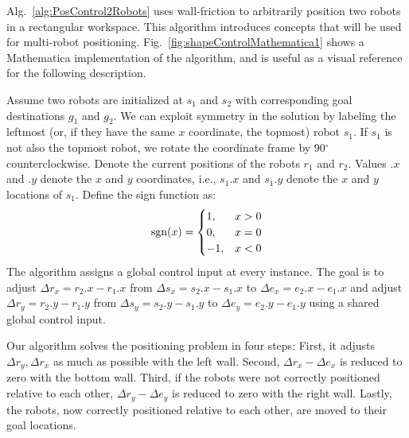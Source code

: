 \begin{figure*}
\caption{\label{fig:shapeControlMathematica1}{Frames from an implementation of Alg.\ \ref{alg:PosControl2Robots}: two robot positioning using walls with infinite friction. 
Robot start positions are shown by a square, and goal positions by a circle.  Dashed lines show the shortest route if robots could be controlled independently.  Solid arrows show path given by  Alg.\ \ref{alg:PosControl2Robots}.
Online demonstration and source code at \citep{Shahrokhi2015mathematicaParticle}.
}
\vspace{-1em}
}
\end{figure*}

Alg.~\ref{alg:PosControl2Robots} uses wall-friction to arbitrarily position two robots in a rectangular workspace.  This algorithm  introduces concepts that will be used for multi-robot positioning. Fig.~\ref{fig:shapeControlMathematica1} shows a Mathematica implementation of the algorithm, and is useful as a visual reference for the following description.

Assume two robots are initialized at $s_1$ and $s_2$ with corresponding goal destinations $g_1$ and $g_2$. 
We can exploit symmetry in the solution by labeling the leftmost  (or, if they have the same $x$ coordinate, the topmost) robot $s_1$.  If $s_1$ is not also the topmost robot, we rotate the coordinate frame by 90$^\circ$ counterclockwise.
Denote the current positions of the robots  $r_1$ and $r_2$. 
Values $.x$ and $.y$ denote the $x$ and $y$ coordinates, i.e., $s_1.x$ and $s_1.y$ denote the $x$ and $y$ locations of $s_1$. Define the sign function as:
\begin{align}
\operatorname{sgn} (x) = \begin{cases}  1, &  x > 0 \\
0, & x=0\\
-1, & x<0 \end{cases} 
\end{align}
The algorithm assigns a global control input at every instance.
The goal is to adjust 
 $\Delta r_x = r_2.x-r_1.x$ from $\Delta s_x = s_2.x-s_1.x$ to $\Delta e_x = e_2.x-e_1.x$ and  adjust 
 $\Delta r_y = r_2.y-r_1.y$ from $\Delta s_y = s_2.y-s_1.y$ to $\Delta e_y = e_2.y-e_1.y$ using a shared global control input. 

Our algorithm solves the positioning problem in four steps: 
First, it adjusts $\Delta r_y , \Delta r_x$ as much as possible with the left wall.
Second, $\Delta r_x -\Delta e_x$ is reduced to zero with the bottom wall.
Third, if the robots were not correctly positioned relative to each other, $\Delta r_y -\Delta e_y$ is reduced to zero with the right wall.
Lastly, the robots, now correctly positioned relative to each other, are moved to their goal locations.

